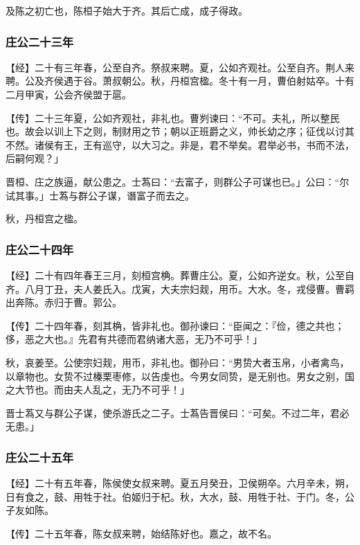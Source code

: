 \documentclass[]{article}
\begin{document}
及陈之初亡也，陈桓子始大于齐。其后亡成，成子得政。

\hypertarget{header-n527}{%
\subsubsection{庄公二十三年 }\label{header-n527}}

【经】二十有三年春，公至自齐。祭叔来聘。夏，公如齐观社。公至自齐。荆人来聘。公及齐侯遇于谷。萧叔朝公。秋，丹桓宫楹。冬十有一月，曹伯射姑卒。十有二月甲寅，公会齐侯盟于扈。

【传】二十三年夏，公如齐观社，非礼也。曹刿谏曰：``不可。夫礼，所以整民也。故会以训上下之则，制财用之节；朝以正班爵之义，帅长幼之序；征伐以讨其不然。诸侯有王，王有巡守，以大习之。非是，君不举矣。君举必书，书而不法，后嗣何观？」

晋桓、庄之族逼，献公患之。士蒍曰：``去富子，则群公子可谋也已。」公曰：``尔试其事。」士蒍与群公子谋，谮富子而去之。

秋，丹桓宫之楹。

\hypertarget{header-n534}{%
\subsubsection{庄公二十四年}\label{header-n534}}

【经】二十有四年春王三月，刻桓宫桷。葬曹庄公。夏，公如齐逆女。秋，公至自齐。八月丁丑，夫人姜氏入。戊寅，大夫宗妇觌，用币。大水。冬，戎侵曹。曹羁出奔陈。赤归于曹。郭公。

【传】二十四年春，刻其桷，皆非礼也。御孙谏曰：``臣闻之：『俭，德之共也；侈，恶之大也。』先君有共德而君纳诸大恶，无乃不可乎！」

秋，哀姜至。公使宗妇觌，用币，非礼也。御孙曰：``男贽大者玉帛，小者禽鸟，以章物也。女贽不过榛栗枣修，以告虔也。今男女同贽，是无别也。男女之别，国之大节也。而由夫人乱之，无乃不可乎！」

晋士蒍又与群公子谋，使杀游氏之二子。士蒍告晋侯曰：``可矣。不过二年，君必无患。」

\hypertarget{header-n541}{%
\subsubsection{庄公二十五年 }\label{header-n541}}

【经】二十有五年春，陈侯使女叔来聘。夏五月癸丑，卫侯朔卒。六月辛未，朔，日有食之，鼓、用牲于社。伯姬归于杞。秋，大水，鼓、用牲于社、于门。冬，公子友如陈。

【传】二十五年春，陈女叔来聘，始结陈好也。嘉之，故不名。
\end{document}
